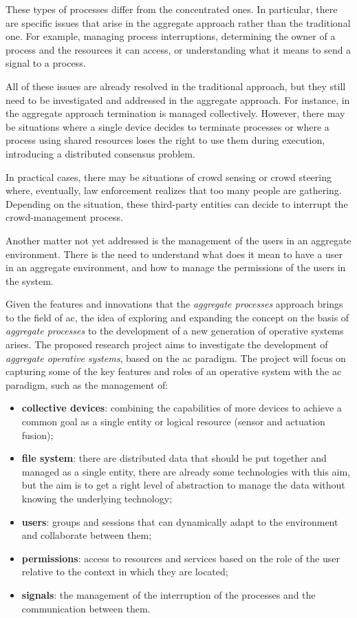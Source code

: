 \documentclass[12pt, a4paper]{article}
\begin{document}
These types of processes differ from the concentrated ones.
%
In particular, there are specific issues that arise in the aggregate approach rather than the traditional one.
%
For example, managing process interruptions, determining the owner of a process and the resources it can access,
or understanding what it means to send a signal to a process.

All of these issues are already resolved in the traditional approach,
but they still need to be investigated and addressed in the aggregate approach.
%
For instance, in the aggregate approach termination is managed collectively.
%
However,
there may be situations where a single device decides to terminate processes or where a process using shared
resources loses the right to use them during execution,
introducing a distributed consensus problem.

In practical cases, there may be situations of crowd sensing or crowd steering where,
eventually,
law enforcement realizes that too many people are gathering.
%
Depending on the situation,
these third-party entities can decide to interrupt the crowd-management process.

Another matter not yet addressed is the management of the users in an aggregate environment.
%
There is the need to understand what does it mean to have a user in an aggregate environment,
and how to manage the permissions of the users in the system.

Given the features and innovations that the \emph{aggregate processes} approach brings to the field of \ac{ac},
the idea of exploring and expanding the concept on the basis of \emph{aggregate processes} to the development
of a new generation of operative systems arises.
%
The proposed research project aims to investigate the development of \emph{aggregate operative systems},
based on the \ac{ac} paradigm.
%
The project will focus on capturing some of the key features and roles of an operative system with the \ac{ac} paradigm,
such as the management of:
\begin{itemize}
    \item \textbf{collective devices}: combining the capabilities of more devices to achieve a common goal as a single
        entity or logical resource (sensor and actuation fusion);
    \item \textbf{file system}: there are distributed data that should be put together and managed as a single entity,
        there are already some technologies with this aim, but the aim is to get a right level of abstraction to manage the data
        without knowing the underlying technology;
    \item \textbf{users}: groups and sessions that can dynamically adapt to the environment and collaborate between them;
    \item \textbf{permissions}: access to resources and services based on the role of the user relative to the context in which they are located;
    \item \textbf{signals}: the management of the interruption of the processes and the communication between them.
\end{itemize}
\end{document}
